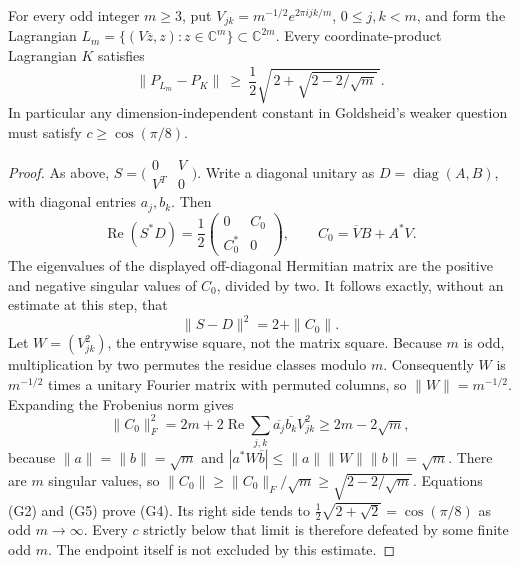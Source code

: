 \begin{theorem}\ours
For every odd integer \(m\ge3\), put
\(V_{jk}=m^{-1/2}e^{2\pi i jk/m}\), \(0\le j,k<m\), and form the
Lagrangian \(L_m=\{(V\overline z,z):z\in\mathbb C^m\}\subset\mathbb C^{2m}\).
Every coordinate-product Lagrangian \(K\) satisfies
\[
 \|P_{L_m}-P_K\|\ \geq\
 \frac12\sqrt{\,2+\sqrt{2-2/\sqrt m}\,}. \tag{G4}
\]
In particular any dimension-independent constant in Goldsheid's weaker
question must satisfy \(c\ge\cos(\pi/8)\).
\end{theorem}
\begin{proof}
As above, \(S=\bigl(\begin{smallmatrix}0&V\\V^T&0\end{smallmatrix}\bigr)\).
Write a diagonal unitary as \(D=\operatorname{diag}(A,B)\), with diagonal
entries \(a_j,b_k\). Then
\[
 \operatorname{Re}(S^*D)=\frac12
 \begin{pmatrix}0&C_0\\C_0^*&0\end{pmatrix},\qquad
 C_0=\overline V B+A^*V.
\]
The eigenvalues of the displayed off-diagonal Hermitian matrix are the
positive and negative singular values of \(C_0\), divided by two.
It follows exactly, without an estimate at this step, that
\[
 \|S-D\|^2=2+\|C_0\|. \tag{G5}
\]
Let \(W=(V_{jk}^2)\), the entrywise square, not the matrix square.
Because \(m\) is odd, multiplication by two permutes the residue classes
modulo \(m\). Consequently \(W\) is \(m^{-1/2}\) times a unitary
Fourier matrix with permuted columns, so \(\|W\|=m^{-1/2}\).
Expanding the Frobenius norm gives
\[
 \|C_0\|_F^2
 =2m+2\operatorname{Re}\sum_{j,k}\overline{a_j}\overline{b_k}V_{jk}^2
 \ge2m-2\sqrt m,
\]
because \(\|a\|=\|b\|=\sqrt m\) and
\(|a^*W\overline b|\le\|a\|\|W\|\|b\|=\sqrt m\).
There are \(m\) singular values, so
\(\|C_0\|\ge\|C_0\|_F/\sqrt m\ge\sqrt{2-2/\sqrt m}\).
Equations (G2) and (G5) prove (G4). Its right side tends to
\(\tfrac12\sqrt{2+\sqrt2}=\cos(\pi/8)\) as odd \(m\to\infty\).
Every \(c\) strictly below that limit is therefore defeated by some
finite odd \(m\). The endpoint itself is not excluded by this estimate.
\end{proof}

